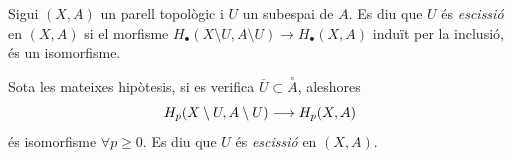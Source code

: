 \documentclass[../main.tex]{subfiles}
\begin{document}
\begin{defi}
[Escissió] Sigui $(X,A)$ un parell topològic i $U$ un subespai de $A$. Es diu que $U$ és \textit{escissió} en $(X,A)$ si el morfisme $H_\bullet(X\setminus U,A\setminus U)\rightarrow H_\bullet(X,A)$ induït per la inclusió, és un isomorfisme.
\end{defi}

\begin{ter}
\label{ter:teoremaescissio} Sota les mateixes hipòtesis, si es verifica $\overline{U}\subset\overset{\circ}{A}$, aleshores 
\begin{equation}
    \notag
    H_p(X\setminus U, A\setminus U) \longrightarrow H_p(X,A)
\end{equation}
és isomorfisme $\forall p\geq 0$. Es diu que $U$ és \textit{escissió} en $(X,A)$.
\end{ter}
\end{document}
